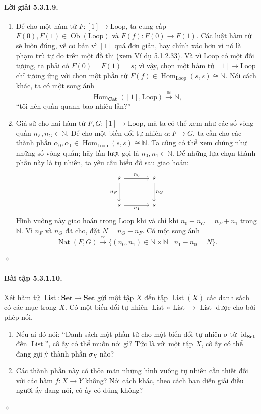 \paragraph{Lời giải 5.3.1.9.}
\begin{enumerate}[label=\alph*.]
\item Để cho một hàm tử $F:[1]\to\mathrm{Loop}$, ta cung cấp $F(0),F(1)\in\operatorname{Ob}(\mathrm{Loop})$ và $F(f):F(0)\to F(1)$. Các luật hàm tử sẽ luôn đúng, về cơ bản vì $[1]$ quá đơn giản, hay chính xác hơn vì nó là phạm trù tự do trên một đồ thị (xem Ví dụ 5.1.2.33). Và vì $\mathrm{Loop}$ có một đối tượng, ta phải có $F(0)=F(1)=s$; vì vậy, chọn một hàm tử $[1]\to\mathrm{Loop}$ chỉ tương ứng với chọn một phần tử $F(f)\in\operatorname{Hom}_{\mathrm{Loop}}(s,s)\cong\mathbb N$. Nói cách khác, ta có một song ánh
\[\operatorname{Hom}_{\mathbf{Cat}}([1],\mathrm{Loop})\xrightarrow{\cong}\mathbb N,\]
``tôi nên quấn quanh bao nhiêu lần?''
\item Giả sử cho hai hàm tử $F,G:[1]\to\mathrm{Loop}$, mà ta có thể xem như các số vòng quấn $n_F,n_G\in\mathbb N$. Để cho một biến đổi tự nhiên $\alpha:F\to G$, ta cần cho các thành phần $\alpha_0,\alpha_1\in\operatorname{Hom}_{\mathrm{Loop}}(s,s)\cong\mathbb N$. Ta cũng có thể xem chúng như những số vòng quấn; hãy lần lượt gọi là $n_0,n_1\in\mathbb N$. Để những lựa chọn thành phần này là tự nhiên, ta yêu cầu biểu đồ sau giao hoán:
\[\begin{tikzcd}[column sep=large,row sep=large]
s\arrow[r,"n_0"]\arrow[d,"n_F"']&s\arrow[d,"n_G"]\\s\arrow[r,"n_1"']&s
\end{tikzcd}\]
Hình vuông này giao hoán trong $\mathrm{Loop}$ khi và chỉ khi $n_0+n_G=n_F+n_1$ trong $\mathbb N$. Vì $n_F$ và $n_G$ đã cho, đặt $N=n_G-n_F$. Có một song ánh
\[\operatorname{Nat}(F,G)\xrightarrow{\cong}\{(n_0,n_1)\in\mathbb N\times\mathbb N\mid n_1-n_0=N\}.\]
\end{enumerate}\hfill$\diamond$
\paragraph{Bài tập 5.3.1.10.} Xét hàm tử $\operatorname{List}:\mathbf{Set}\to\mathbf{Set}$ gửi một tập $X$ đến tập $\operatorname{List}(X)$ các danh sách có các mục trong $X$. Có một biến đổi tự nhiên $\operatorname{List}\circ\operatorname{List}\to\operatorname{List}$ được cho bởi phép nối.
\begin{enumerate}[label=\alph*.]
\item Nếu ai đó nói: ``Danh sách một phần tử cho một biến đổi tự nhiên $\sigma$ từ $\operatorname{id}_{\mathbf{Set}}$ đến $\operatorname{List}$'', cô ấy có thể muốn nói gì? Tức là với một tập $X$, cô ấy có thể đang gợi ý thành phần $\sigma_X$ nào?
\item Các thành phần này có thỏa mãn những hình vuông tự nhiên cần thiết đối với các hàm $f:X\to Y$ không? Nói cách khác, theo cách bạn diễn giải điều người ấy đang nói, cô ấy có đúng không?
\end{enumerate}\hfill$\diamond$

